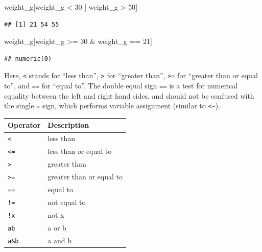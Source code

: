 \documentclass[
]{book}
\newenvironment{Shaded}{\begin{snugshade}}{\end{snugshade}}
\newcommand{\DecValTok}[1]{\textcolor[rgb]{0.00,0.00,0.81}{#1}}
\newcommand{\NormalTok}[1]{#1}
\newcommand{\SpecialCharTok}[1]{\textcolor[rgb]{0.00,0.00,0.00}{#1}}
\begin{document}
\begin{Shaded}
\begin{Highlighting}[]
\NormalTok{weight\_g[weight\_g }\SpecialCharTok{\textless{}} \DecValTok{30} \SpecialCharTok{|}\NormalTok{ weight\_g }\SpecialCharTok{\textgreater{}} \DecValTok{50}\NormalTok{]}
\end{Highlighting}
\end{Shaded}

\begin{verbatim}
## [1] 21 54 55
\end{verbatim}

\begin{Shaded}
\begin{Highlighting}[]
\NormalTok{weight\_g[weight\_g }\SpecialCharTok{\textgreater{}=} \DecValTok{30} \SpecialCharTok{\&}\NormalTok{ weight\_g }\SpecialCharTok{==} \DecValTok{21}\NormalTok{]}
\end{Highlighting}
\end{Shaded}

\begin{verbatim}
## numeric(0)
\end{verbatim}

Here, \texttt{\textless{}} stands for ``less than'', \texttt{\textgreater{}} for ``greater than'', \texttt{\textgreater{}=} for ``greater than or equal to'', and \texttt{==} for ``equal to''. The double equal sign \texttt{==} is a test for numerical equality between the left and right hand sides, and should not be confused with the single \texttt{=} sign, which performs variable assignment (similar to \texttt{\textless{}-}).

\begin{longtable}[]{@{}ll@{}}
\toprule
Operator & Description \\
\midrule
\endhead
\texttt{\textless{}} & less than \\
\texttt{\textless{}=} & less than or equal to \\
\texttt{\textgreater{}} & greater than \\
\texttt{\textgreater{}=} & greater than or equal to \\
\texttt{==} & equal to \\
\texttt{!=} & not equal to \\
\texttt{!x} & not x \\
\texttt{a\textbar{}b} & a or b \\
\texttt{a\&b} & a and b \\
\bottomrule
\end{longtable}
\end{document}
